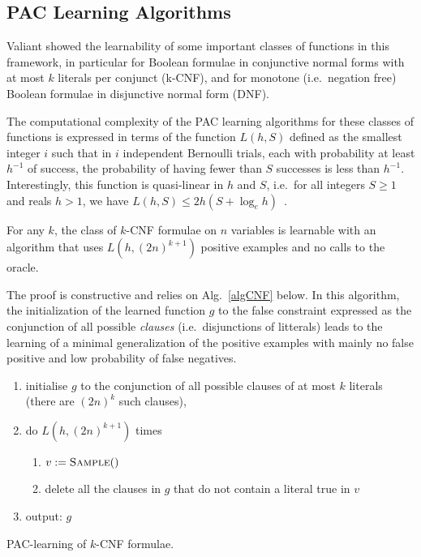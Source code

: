 \documentclass{llncs}
\begin{document}
\subsection{PAC Learning Algorithms}

Valiant showed the learnability of some important classes of functions in this framework,
in particular for Boolean formulae in conjunctive normal forms with at most $k$ literals per conjunct (k-CNF),
and for monotone (i.e.~negation free) Boolean formulae in disjunctive normal form (DNF).

The computational complexity of the PAC learning algorithms for these classes of functions is expressed in terms of the function
$L(h,S)$ defined as the smallest integer $i$ such that
in $i$ independent Bernoulli trials, each with probability at least $h^{-1}$ of success, the probability of having fewer than $S$ successes is less than $h^{-1}$.
Interestingly, this function is quasi-linear in $h$ and $S$, i.e.~for all
integers $S\ge 1$ and reals $h>1$, we have $L(h,S) \le 2h(S+\log_e h)$~\cite{Valiant84cacm}.

\begin{theorem}\label{thm:kcnf}
For any $k$, the class of $k$-CNF formulae on $n$ variables is learnable with an
algorithm that uses $L(h,{(2 n)}^{k+1})$ positive examples and no calls to the
oracle.
\end{theorem}

The proof is constructive and relies on Alg.~\ref{algCNF} below. In this algorithm, the initialization of the learned function $g$ to the false constraint expressed as the conjunction of all possible \emph{clauses} (i.e.~disjunctions of litterals)
leads to the learning of a minimal generalization of the positive examples with mainly no false positive and low probability of false negatives.

\begin{algorithm}
\begin{enumerate}
  \item initialise $g$ to the conjunction of all possible clauses of at most $k$ literals (there are $(2n)^k$ such clauses),
\item do $L(h,(2n)^{k+1})$ times 
\begin{enumerate}
\item $v:=\textsc{Sample}()$
\item delete all the clauses in $g$ that do not contain a literal true in $v$
\end{enumerate}
\item output: $g$
\end{enumerate}
\caption{PAC-learning of $k$-CNF formulae.\label{algCNF}}
\end{algorithm}
\end{document}
